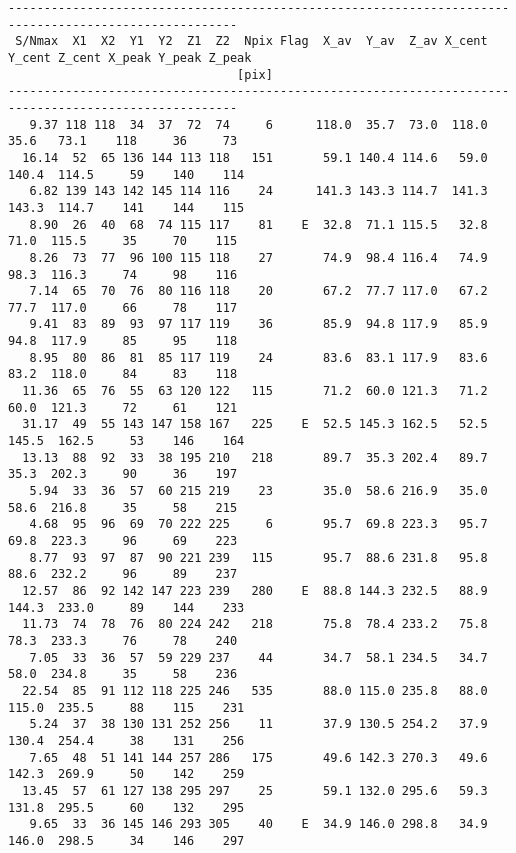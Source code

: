 \begin{landscape}
{\begin{verbatim}
------------------------------------------------------------------------------------------------------
 S/Nmax  X1  X2  Y1  Y2  Z1  Z2  Npix Flag  X_av  Y_av  Z_av X_cent Y_cent Z_cent X_peak Y_peak Z_peak
                                [pix]                                                                 
------------------------------------------------------------------------------------------------------
   9.37 118 118  34  37  72  74     6      118.0  35.7  73.0  118.0   35.6   73.1    118     36     73
  16.14  52  65 136 144 113 118   151       59.1 140.4 114.6   59.0  140.4  114.5     59    140    114
   6.82 139 143 142 145 114 116    24      141.3 143.3 114.7  141.3  143.3  114.7    141    144    115
   8.90  26  40  68  74 115 117    81    E  32.8  71.1 115.5   32.8   71.0  115.5     35     70    115
   8.26  73  77  96 100 115 118    27       74.9  98.4 116.4   74.9   98.3  116.3     74     98    116
   7.14  65  70  76  80 116 118    20       67.2  77.7 117.0   67.2   77.7  117.0     66     78    117
   9.41  83  89  93  97 117 119    36       85.9  94.8 117.9   85.9   94.8  117.9     85     95    118
   8.95  80  86  81  85 117 119    24       83.6  83.1 117.9   83.6   83.2  118.0     84     83    118
  11.36  65  76  55  63 120 122   115       71.2  60.0 121.3   71.2   60.0  121.3     72     61    121
  31.17  49  55 143 147 158 167   225    E  52.5 145.3 162.5   52.5  145.5  162.5     53    146    164
  13.13  88  92  33  38 195 210   218       89.7  35.3 202.4   89.7   35.3  202.3     90     36    197
   5.94  33  36  57  60 215 219    23       35.0  58.6 216.9   35.0   58.6  216.8     35     58    215
   4.68  95  96  69  70 222 225     6       95.7  69.8 223.3   95.7   69.8  223.3     96     69    223
   8.77  93  97  87  90 221 239   115       95.7  88.6 231.8   95.8   88.6  232.2     96     89    237
  12.57  86  92 142 147 223 239   280    E  88.8 144.3 232.5   88.9  144.3  233.0     89    144    233
  11.73  74  78  76  80 224 242   218       75.8  78.4 233.2   75.8   78.3  233.3     76     78    240
   7.05  33  36  57  59 229 237    44       34.7  58.1 234.5   34.7   58.0  234.8     35     58    236
  22.54  85  91 112 118 225 246   535       88.0 115.0 235.8   88.0  115.0  235.5     88    115    231
   5.24  37  38 130 131 252 256    11       37.9 130.5 254.2   37.9  130.4  254.4     38    131    256
   7.65  48  51 141 144 257 286   175       49.6 142.3 270.3   49.6  142.3  269.9     50    142    259
  13.45  57  61 127 138 295 297    25       59.1 132.0 295.6   59.3  131.8  295.5     60    132    295
   9.65  33  36 145 146 293 305    40    E  34.9 146.0 298.8   34.9  146.0  298.5     34    146    297

\end{verbatim}}
\end{landscape}
